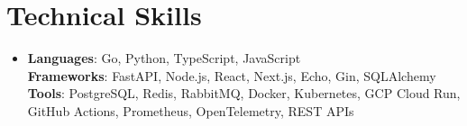 \documentclass[letterpaper,11pt]{article}
\begin{document}
\section{Technical Skills}
\begin{itemize}[leftmargin=0.15in, label={}, topsep=0pt, itemsep=0pt, parsep=0pt, partopsep=0pt]
  \item{\fontsize{9.0pt}{9.25pt}\selectfont
   \textbf{Languages}{: Go, Python, TypeScript, JavaScript} \\
   \textbf{Frameworks}{: FastAPI, Node.js, React, Next.js, Echo, Gin, SQLAlchemy} \\
   \textbf{Tools}{: PostgreSQL, Redis, RabbitMQ, Docker, Kubernetes, GCP Cloud Run, GitHub Actions, Prometheus, OpenTelemetry, REST APIs} \\
  }
\end{itemize}
\end{document}
